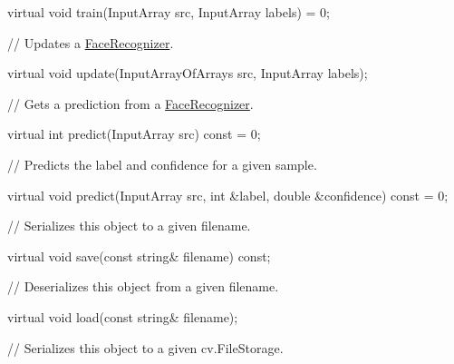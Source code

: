 {\ttfamily virtual void train(\+Input\+Array src, Input\+Array labels) = 0;}

{\ttfamily }

{\ttfamily }

{\ttfamily // Updates a \mbox{\hyperlink{classorg_1_1opencv_1_1contrib_1_1_face_recognizer}{Face\+Recognizer}}.}

{\ttfamily }

{\ttfamily }

{\ttfamily virtual void update(\+Input\+Array\+Of\+Arrays src, Input\+Array labels);}

{\ttfamily }

{\ttfamily }

{\ttfamily // Gets a prediction from a \mbox{\hyperlink{classorg_1_1opencv_1_1contrib_1_1_face_recognizer}{Face\+Recognizer}}.}

{\ttfamily }

{\ttfamily }

{\ttfamily virtual int predict(\+Input\+Array src) const = 0;}

{\ttfamily }

{\ttfamily }

{\ttfamily // Predicts the label and confidence for a given sample.}

{\ttfamily }

{\ttfamily }

{\ttfamily virtual void predict(\+Input\+Array src, int \&label, double \&confidence) const = 0;}

{\ttfamily }

{\ttfamily }

{\ttfamily // Serializes this object to a given filename.}

{\ttfamily }

{\ttfamily }

{\ttfamily virtual void save(const string\& filename) const;}

{\ttfamily }

{\ttfamily }

{\ttfamily // Deserializes this object from a given filename.}

{\ttfamily }

{\ttfamily }

{\ttfamily virtual void load(const string\& filename);}

{\ttfamily }

{\ttfamily }

{\ttfamily // Serializes this object to a given cv.\+File\+Storage.}

